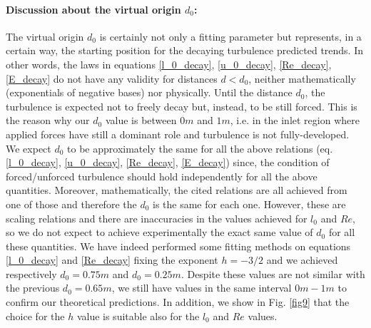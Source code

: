 \documentclass[11pt,titlepage]{article}
\begin{document}
\paragraph{Discussion about the virtual origin $d_0$:}
The virtual origin $d_0$ is certainly not only a fitting parameter but represents, in a certain way, the starting position for the decaying turbulence predicted trends. In other words, the laws in equations \ref{l_0_decay}, \ref{u_0_decay}, \ref{Re_decay}, \ref{E_decay} do not have any validity for distances $d < d_0$, neither mathematically (exponentials of negative bases) nor physically. Until the distance $d_0$, the turbulence is expected not to freely decay but, instead, to be still forced. This is the reason why our $d_0$ value is between $0m$ and $1m$, i.e. in the inlet region where applied forces have still a dominant role and turbulence is not fully-developed. \\
We expect $d_0$ to be approximately the same for all the above relations (eq. \ref{l_0_decay}, \ref{u_0_decay}, \ref{Re_decay}, \ref{E_decay}) since, the condition of forced/unforced turbulence should hold independently for all the above quantities. Moreover, mathematically, the cited relations are all achieved from one of those and therefore the $d_0$ is the same for each one. However, these are scaling relations and there are inaccuracies in the values achieved for $l_0$ and $Re$, so we do not expect to achieve experimentally the exact same value of $d_0$ for all these quantities. We have indeed performed some fitting methods on equations \ref{l_0_decay} and \ref{Re_decay} fixing the exponent $h=-3/2$ and we achieved respectively $d_0 = 0.75m$ and $d_0 = 0.25m$. Despite these values are not similar with the previous $d_0 = 0.65m$, we still have values in the same interval $0m-1m$ to confirm our theoretical predictions. In addition, we show in Fig. \ref{fig9} that the choice for the $h$ value is suitable also for the $l_0$ and $Re$ values.
\end{document}
